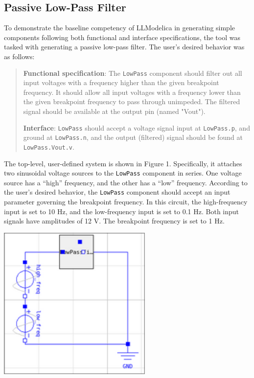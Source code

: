 \documentclass[11pt]{article}
\begin{document}
\subsection{Passive Low-Pass Filter}
\label{sec:org7782fac}
To demonstrate the baseline competency of LLModelica in generating simple components following both functional and interface specifications, the tool was tasked with generating a passive low-pass filter. The user's desired behavior was as follows:

\begin{quote}
\textbf{Functional specification}: The \texttt{LowPass} component should filter out all input voltages with a frequency higher than the given breakpoint frequency. It should allow all input voltages with a frequency lower than the given breakpoint frequency to pass through unimpeded. The filtered signal should be available at the output pin (named "Vout").

\textbf{Interface}: \texttt{LowPass} should accept a voltage signal input at \texttt{LowPass.p}, and ground at \texttt{LowPass.n}, and the output (filtered) signal should be found at \texttt{LowPass.Vout.v}.
\end{quote}

The top-level, user-defined system is shown in Figure 1. Specifically, it attaches two sinusoidal voltage sources to the \texttt{LowPass} component in series. One voltage source has a ``high'' frequency, and the other has a ``low'' frequency. According to the user's desired behavior, the \texttt{LowPass} component should accept an input parameter governing the breakpoint frequency. In this circuit, the high-frequency input is set to 10 Hz, and the low-frequency input is set to 0.1 Hz. Both input signals have amplitudes of 12 V. The breakpoint frequency is set to 1 Hz.

\begin{center}
\includegraphics[width=3in]{./images/passive_lowpass_final_circuit.png}
\end{center}
\end{document}
